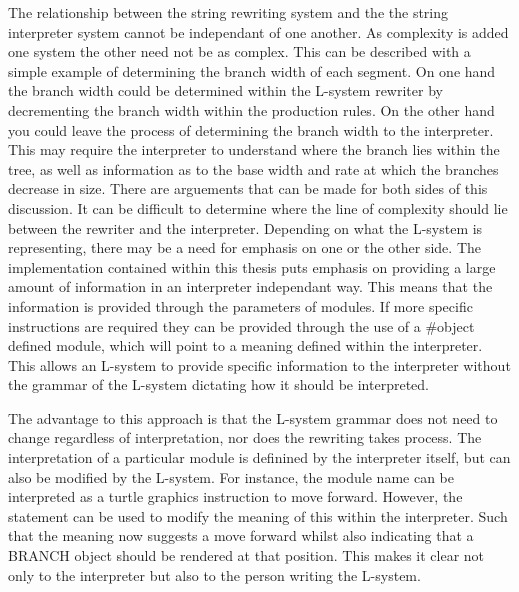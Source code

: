 
The relationship between the string rewriting system and the the string interpreter system cannot be independant of one another. As complexity is added one system the other need not be as complex. This can be described with a simple example of determining the branch width of each segment. On one hand the branch width could be determined within the L-system rewriter by decrementing the branch width within the production rules. On the other hand you could leave the process of determining the branch width to the interpreter. This may require the interpreter to  understand where the branch lies within the tree, as well as information as to the base width and rate at which the branches decrease in size. There are arguements that can be made for both sides of this discussion. It can be difficult to determine where the line of complexity should lie between the rewriter and the interpreter. Depending on what the L-system is representing, there may be a need for emphasis on one or the other side. The implementation contained within this thesis puts emphasis on providing a large amount of information in an interpreter independant way. This means that the information is provided through the parameters of modules. If more specific instructions are required they can be provided through the use of a \#object defined module, which will point to a meaning defined within the interpreter. This allows an L-system to provide specific information to the interpreter without the grammar of the L-system dictating how it should be interpreted.

The advantage to this approach is that the L-system grammar does not need to change regardless of interpretation, nor does the rewriting takes process. The interpretation of a particular module is definined by the interpreter itself, but can also be modified by the L-system. For instance, the module name  can be interpreted as a turtle graphics instruction to move forward. However, the statement  can be used to modify the meaning of this within the interpreter. Such that the meaning now suggests a move forward whilst also indicating that a BRANCH object should be rendered at that position. This makes it clear not only to the interpreter but also to the person writing the L-system.